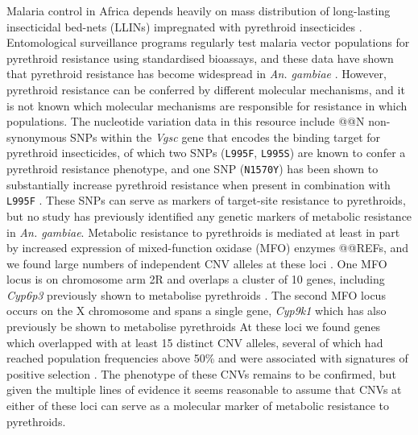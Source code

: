 \documentclass[a4paper,11pt,abstracton,hidelinks]{scrartcl}
\begin{document}
Malaria control in Africa depends heavily on mass distribution of long-lasting insecticidal bed-nets (LLINs) impregnated with pyrethroid insecticides \cite{Ranson2016, churcher2016}.
%
Entomological surveillance programs regularly test malaria vector populations for pyrethroid resistance using standardised bioassays, and these data have shown that pyrethroid resistance has become widespread in \textit{An. gambiae} \cite{Hemingway2016}.
%
However, pyrethroid resistance can be conferred by different molecular mechanisms, and it is not known which molecular mechanisms are responsible for resistance in which populations.
%
The nucleotide variation data in this resource include @@N non-synonymous SNPs within the \textit{Vgsc} gene that encodes the binding target for pyrethroid insecticides, of which two SNPs (\texttt{L995F}, \texttt{L995S}) are known to confer a pyrethroid resistance phenotype, and one SNP (\texttt{N1570Y}) has been shown to substantially increase pyrethroid resistance when present in combination with \texttt{L995F} \cite{jones2012}. 
%
These SNPs can serve as markers of target-site resistance to pyrethroids, but no study has previously identified any genetic markers of metabolic resistance in \textit{An. gambiae}.
%
Metabolic resistance to pyrethroids is mediated at least in part by increased expression of mixed-function oxidase (MFO) enzymes @@REFs, and we found large numbers of independent CNV alleles at these loci \cite{lucas2019}.
%
One MFO locus is on chromosome arm 2R and overlaps a cluster of 10 genes, including \textit{Cyp6p3} previously shown to metabolise pyrethroids \cite{muller2008}.
%
The second MFO locus occurs on the X chromosome and spans a single gene, \textit{Cyp9k1} which has also previously be shown to  metabolise pyrethroids \cite{vontas2018}
%
At these loci we found genes which overlapped with at least 15 distinct CNV alleles, several of which had reached population frequencies above 50\% and were associated with signatures of positive selection \cite{lucas2019}.
%
The phenotype of these CNVs remains to be confirmed, but given the multiple lines of evidence it seems reasonable to assume that CNVs at either of these loci can serve as a molecular marker of metabolic resistance to pyrethroids.
\end{document}
